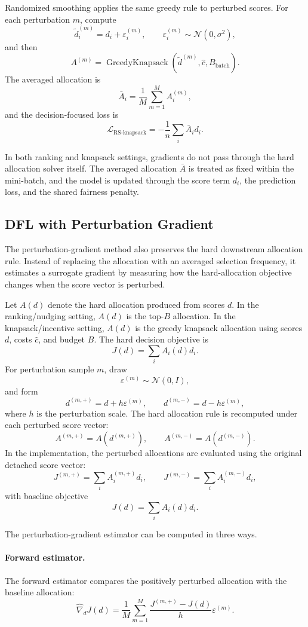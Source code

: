 Randomized smoothing applies the same greedy rule to perturbed scores. For each perturbation $m$, compute
\[
\tilde d_i^{(m)} = d_i + \varepsilon_i^{(m)},
\qquad
\varepsilon_i^{(m)}\sim\mathcal{N}(0,\sigma^2),
\]
and then
\[
A^{(m)}
=
\operatorname{GreedyKnapsack}(\tilde d^{(m)},\hat c,B_{\text{batch}}).
\]
The averaged allocation is
\[
\bar A_i
=
\frac{1}{M}
\sum_{m=1}^M A_i^{(m)},
\]
and the decision-focused loss is
\[
\mathcal{L}_{\text{RS-knapsack}}
=
-
\frac{1}{n}
\sum_i \bar A_i d_i.
\]

In both ranking and knapsack settings, gradients do not pass through the hard allocation solver itself. The averaged allocation $\bar A$ is treated as fixed within the mini-batch, and the model is updated through the score term $d_i$, the prediction loss, and the shared fairness penalty.

\subsection{DFL with Perturbation Gradient}
The perturbation-gradient method also preserves the hard downstream allocation rule. Instead of replacing the allocation with an averaged selection frequency, it estimates a surrogate gradient by measuring how the hard-allocation objective changes when the score vector is perturbed.

Let $A(d)$ denote the hard allocation produced from scores $d$. In the ranking/nudging setting, $A(d)$ is the top-$B$ allocation. In the knapsack/incentive setting, $A(d)$ is the greedy knapsack allocation using scores $d$, costs $\hat c$, and budget $B$. The hard decision objective is
\[
J(d)
=
\sum_i A_i(d)d_i.
\]
For perturbation sample $m$, draw
\[
\varepsilon^{(m)}\sim\mathcal{N}(0,I),
\]
and form
\[
d^{(m,+)} = d + h\varepsilon^{(m)},
\qquad
 d^{(m,-)} = d - h\varepsilon^{(m)},
\]
where $h$ is the perturbation scale. The hard allocation rule is recomputed under each perturbed score vector:
\[
A^{(m,+)} = A(d^{(m,+)}),
\qquad
A^{(m,-)} = A(d^{(m,-)}).
\]
In the implementation, the perturbed allocations are evaluated using the original detached score vector:
\[
J^{(m,+)} = \sum_i A_i^{(m,+)}d_i,
\qquad
J^{(m,-)} = \sum_i A_i^{(m,-)}d_i,
\]
with baseline objective
\[
J(d)=\sum_i A_i(d)d_i.
\]

The perturbation-gradient estimator can be computed in three ways.

\paragraph{Forward estimator.}
The forward estimator compares the positively perturbed allocation with the baseline allocation:
\[
\widehat{\nabla}_d J(d)
=
\frac{1}{M}
\sum_{m=1}^M
\frac{J^{(m,+)}-J(d)}{h}
\varepsilon^{(m)}.
\]

